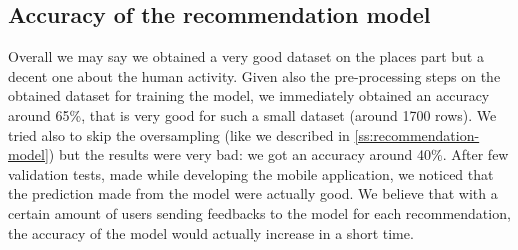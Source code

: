 \documentclass[../../main]{subfiles}
\begin{document}
\subsection{Accuracy of the recommendation model}
\label{ss:accuracy-recommendation-model}

Overall we may say we obtained a very good dataset on the places part but a decent one about the human activity.
Given also the pre-processing steps on the obtained dataset for training the model, we immediately obtained an accuracy around 65\%, that is very good for such a small dataset (around 1700 rows).
We tried also to skip the oversampling (like we described in \ref{ss:recommendation-model}) but the results were very bad: we got an accuracy around 40\%.
After few validation tests, made while developing the mobile application, we noticed that the prediction made from the model were actually good.
We believe that with a certain amount of users sending feedbacks to the model for each recommendation, the accuracy of the model would actually increase in a short time.
\end{document}
